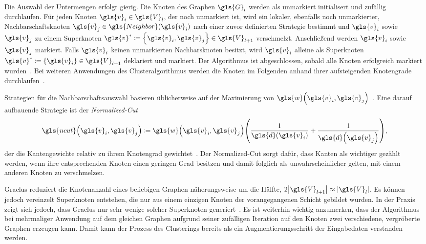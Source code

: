 Die Auswahl der Untermengen erfolgt gierig.
Die Knoten des Graphen $\gls{G}_l$ werden als unmarkiert initialisert und zufällig durchlaufen.
Für jeden Knoten $\gls{v}_i \in \gls{V}_l$, der noch unmarkiert ist, wird ein lokaler, ebenfalls noch unmarkierter, Nachbarschaftsknoten $\gls{v}_j \in \gls{Neighbor}\left(\gls{v}_i\right)$ nach einer zuvor definierten Strategie bestimmt und $\gls{v}_i$ sowie $\gls{v}_j$ zu einem Superknoten $\gls{v}^* \coloneqq \left\{ \gls{v}_i, \gls{v}_j \right\} \in \gls{V}_{l+1}$ verschmelzt.
Anschließend werden $\gls{v}_i$ sowie $\gls{v}_j$ markiert.
Falls $\gls{v}_i$ keinen unmarkierten Nachbarsknoten besitzt, wird $\gls{v}_i$ alleine als Superknoten $\gls{v}^* \coloneqq \left\{ \gls{v}_i \right\} \in \gls{V}_{l+1}$ deklariert und markiert.
Der Algorithmus ist abgeschlossen, sobald alle Knoten erfolgreich markiert wurden~\cite{graclus}.
Bei weiteren Anwendungen des Clusteralgorithmus werden die Knoten im Folgenden anhand ihrer aufsteigenden Knotengrade durchlaufen~\cite{Defferrard}.

Strategien für die Nachbarschaftsauswahl basieren üblicherweise auf der Maximierung von $\gls{w}\left(\gls{v}_i, \gls{v}_j \right)$~\cite{graclus}.
Eine darauf aufbauende Strategie ist der \emph{Normalized-Cut}
\begin{equation*}
  \gls{ncut}\left(\gls{v}_i, \gls{v}_j\right) \coloneqq \gls{w}\left(\gls{v}_i, \gls{v}_j \right) \left(\frac{1}{\gls{d}\left(\gls{v}_i\right)} + \frac{1}{\gls{d}\left(\gls{v}_j\right)}\right),
\end{equation*}
der die Kantengewichte relativ zu ihrem Knotengrad gewichtet~\cite{Defferrard, graclus}.
Der Normalized-Cut sorgt dafür, dass Kanten als wichtiger gezählt werden, wenn ihre entsprechenden Knoten einen geringen Grad besitzen und damit folglich als unwahrscheinlicher gelten, mit einem anderen Knoten zu verschmelzen.

Graclus reduziert die Knotenanzahl eines beliebigen Graphen näherungsweise um die Hälfte, \dhe{} $2 \left|\gls{V}_{l+1}\right| \approx \left|\gls{V}_l\right|$.
Es können jedoch vereinzelt Superknoten entstehen, die nur aus einem einzigen Knoten der vorangegangenen Schicht gebildet wurden.
In der Praxis zeigt sich jedoch, dass Graclus nur sehr wenige solcher Superknoten generiert~\cite{Defferrard}.
Es ist weiterhin wichtig anzumerken, dass der Algorithmus bei mehrmaliger Anwendung auf dem gleichen Graphen aufgrund seiner zufälligen Iteration auf den Knoten zwei verschiedene, vergröberte Graphen erzeugen kann.
Damit kann der Prozess des Clusterings bereits als ein Augmentierungsschritt der Eingabedaten verstanden werden.


